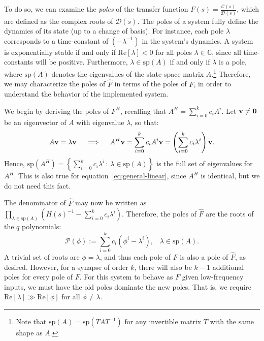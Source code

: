 To do so, we can examine the \emph{poles} of the transfer function $F(s) = \frac{\mathcal{C}(s)}{\mathcal{D}(s)}$, which are defined as the complex roots of $\mathcal{D}(s)$.
The poles of a system fully define the dynamics of its state (up to a change of basis).
For instance,
each pole $\lambda$ corresponds to a time-constant of $\left(-\lambda^{-1}\right)$ in the system's dynamics.
A system is exponentially stable if and only if $\text{Re} \left[ \lambda \right] < 0$ for all poles $\lambda \in \mathbb{C}$, since all time-constants will be positive.
Furthermore, $\lambda \in \text{sp}(A)$ if and only if $\lambda$ is a pole, where $\text{sp}(A)$ denotes the eigenvalues of the state-space matrix $A$.\footnote{%
Note that $\text{sp}(A) = \text{sp}(TAT^{-1})$ for any invertible matrix $T$ with the same shape as $A$.
}
Therefore, we may characterize the poles of $\hat{F}$ in terms of the poles of $F$, in order to understand the behavior of the implemented system.

We begin by deriving the poles of $F^H$, recalling that $A^H = \sum_{i=0}^k c_i A^i$.
Let $\mathbf{v} \ne \mathbf{0}$ be an eigenvector of $A$ with eigenvalue $\lambda$, %
so that:
\begin{align*}
A\mathbf{v} = \lambda \mathbf{v} \quad \implies \quad A^H \mathbf{v} = \sum_{i=0}^k c_i A^i \mathbf{v} = \left( \sum_{i=0}^k c_i \lambda^i \right) \mathbf{v} \text{.}
\end{align*}
Hence, $\text{sp}\left(A^H \right) = \left\{  \sum_{i=0}^k c_i \lambda^i \,:\, \lambda \in \text{sp}(A) \right\}$ is the full set of eigenvalues for $A^H$.
This is also true for equation~\ref{eq:general-linear}, since $A^H$ is identical, but we do not need this fact.

The denominator of $\hat{F}$ may now be written as $\prod_{\lambda \in \text{sp}(A)} \left( H(s)^{-1} - \sum_{i=0}^k c_i \lambda^i \right)$.
Therefore, the poles of $\hat{F}$ are the roots of the $q$ polynomials:
\begin{equation*}
\mathcal{P}(\phi) := \sum_{i=0}^k c_i \left( \phi^i - \lambda^i \right) \text{,} \quad \lambda \in \text{sp}(A) \text{.}
\end{equation*}
A trivial set of roots are $\phi = \lambda$, and thus each pole of $F$ is also a pole of $\hat{F}$, as desired.
However, for a synapse of order $k$, there will also be $k - 1$ additional poles for every pole of $F$.
For this system to behave as $F$ given low-frequency inputs, we must have the old poles dominate the new poles.
That is, we require $\text{Re} \left[ \lambda \right] \gg \text{Re} \left[ \phi \right]$ for all $\phi \ne \lambda$.

